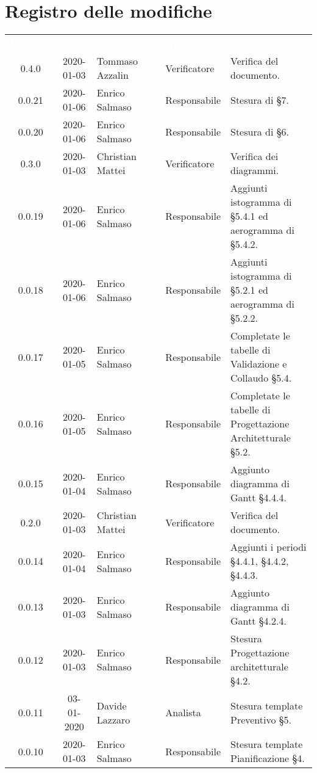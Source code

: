 \section*{Registro delle modifiche}
{
\renewcommand{\arraystretch}{1.5}
\centering
\begin{longtable}{ c c  C{4cm}  C{3cm} C{4cm}}
\textcolor{white}{\textbf{Versione}} & \textcolor{white}{\textbf{Data}} & \textcolor{white}{\textbf{Nominativo}} & \textcolor{white}{\textbf{Ruolo}} & \textcolor{white}{\textbf{Descrizione}}\\	

0.4.0 & 2020-01-03 & Tommaso Azzalin & Verificatore & Verifica del documento.  \\
0.0.21 & 2020-01-06 & Enrico Salmaso & Responsabile & Stesura di §7. \\
0.0.20 & 2020-01-06 & Enrico Salmaso & Responsabile & Stesura di §6. \\
0.3.0 & 2020-01-03 & Christian Mattei & Verificatore & Verifica dei diagrammi.  \\
0.0.19 & 2020-01-06 & Enrico Salmaso & Responsabile & Aggiunti istogramma di §5.4.1 ed aerogramma di §5.4.2.\\
0.0.18 & 2020-01-06 & Enrico Salmaso & Responsabile & Aggiunti istogramma di §5.2.1 ed aerogramma di §5.2.2.\\
0.0.17 & 2020-01-05 & Enrico Salmaso & Responsabile & Completate le tabelle di Validazione e Collaudo §5.4.\\
0.0.16 & 2020-01-05 & Enrico Salmaso & Responsabile & Completate le tabelle di Progettazione Architetturale §5.2.\\
0.0.15 & 2020-01-04 & Enrico Salmaso & Responsabile & Aggiunto diagramma di Gantt §4.4.4. \\
0.2.0 & 2020-01-03 & Christian Mattei & Verificatore & Verifica del documento.  \\
0.0.14 & 2020-01-04 & Enrico Salmaso & Responsabile & Aggiunti i periodi §4.4.1, §4.4.2, §4.4.3.\\
0.0.13 & 2020-01-03 & Enrico Salmaso & Responsabile & Aggiunto diagramma di Gantt §4.2.4.\\
0.0.12 & 2020-01-03 & Enrico Salmaso & Responsabile & Stesura Progettazione architetturale §4.2.\\
0.0.11 & 03-01-2020 & Davide Lazzaro & Analista & Stesura template Preventivo §5.\\
0.0.10 & 2020-01-03 &  Enrico Salmaso & Responsabile & Stesura template Pianificazione §4.\\

\end{longtable}}
